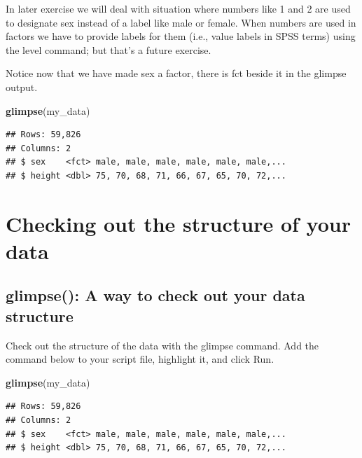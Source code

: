 \documentclass[
]{krantz}
\makeatletter
\newenvironment{Shaded}{\begin{snugshade}}{\end{snugshade}}
\newcommand{\KeywordTok}[1]{\textcolor[rgb]{0.27,0.27,0.27}{\textbf{#1}}}
\newcommand{\NormalTok}[1]{#1}
\newenvironment{kframe}{%
\medskip{}
\setlength{\fboxsep}{.8em}
 \def\at@end@of@kframe{}%
 \ifinner\ifhmode%
  \def\at@end@of@kframe{\end{minipage}}%
  \begin{minipage}{\columnwidth}%
 \fi\fi%
 \def\FrameCommand##1{\hskip\@totalleftmargin \hskip-\fboxsep
 \colorbox{shadecolor}{##1}\hskip-\fboxsep
     \hskip-\linewidth \hskip-\@totalleftmargin \hskip\columnwidth}%
 \MakeFramed {\advance\hsize-\width
   \@totalleftmargin\z@ \linewidth\hsize
   \@setminipage}}%
 {\par\unskip\endMakeFramed%
 \at@end@of@kframe}
\renewenvironment{Shaded}{\begin{kframe}}{\end{kframe}}
\makeatother
\begin{document}
In later exercise we will deal with situation where numbers like 1 and 2 are used to designate sex instead of a label like male or female. When numbers are used in factors we have to provide labels for them (i.e., value labels in SPSS terms) using the level command; but that's a future exercise.

Notice now that we have made sex a factor, there is fct beside it in the glimpse output.

\begin{Shaded}
\begin{Highlighting}[]
\KeywordTok{glimpse}\NormalTok{(my_data)}
\end{Highlighting}
\end{Shaded}

\begin{verbatim}
## Rows: 59,826
## Columns: 2
## $ sex    <fct> male, male, male, male, male, male,...
## $ height <dbl> 75, 70, 68, 71, 66, 67, 65, 70, 72,...
\end{verbatim}

\hypertarget{checking-out-the-structure-of-your-data}{%
\section{Checking out the structure of your data}\label{checking-out-the-structure-of-your-data}}

\hypertarget{glimpse-a-way-to-check-out-your-data-structure}{%
\subsection{glimpse(): A way to check out your data structure}\label{glimpse-a-way-to-check-out-your-data-structure}}

Check out the structure of the data with the glimpse command. Add the command below to your script file, highlight it, and click Run.

\begin{Shaded}
\begin{Highlighting}[]
\KeywordTok{glimpse}\NormalTok{(my_data)}
\end{Highlighting}
\end{Shaded}

\begin{verbatim}
## Rows: 59,826
## Columns: 2
## $ sex    <fct> male, male, male, male, male, male,...
## $ height <dbl> 75, 70, 68, 71, 66, 67, 65, 70, 72,...
\end{verbatim}
\end{document}

